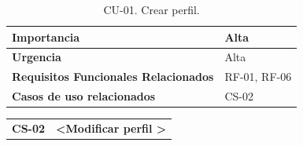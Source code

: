 \begin{table}[htbp]
\begin{tabular}{ |m{3cm}|m{11cm}|  }
\hline
\cellcolor[HTML]{EFEFEF}\textbf{Importancia}                & Alta\\
\hline
\cellcolor[HTML]{EFEFEF}\textbf{Urgencia}                & Alta\\
\hline
\cellcolor[HTML]{EFEFEF}\textbf{Requisitos Funcionales Relacionados}                & { RF-01, RF-06 }\\
\hline
\cellcolor[HTML]{EFEFEF}\textbf{Casos de uso relacionados}                & { CS-02 }\\
\hline
\end{tabular}
\caption{CU-01. Crear perfil.}
\end{table}


\begin{table}[htbp] %
\centering
\begin{tabular}{ |m{3cm}|m{11cm}|  } 
\hline
\cellcolor[HTML]{B9E3F0}\centering\textbf{CS-02} & \cellcolor[HTML]{B9E3F0}\textbf{\textless Modificar perfil \textgreater}\\


\end{tabular}
\end{table}
